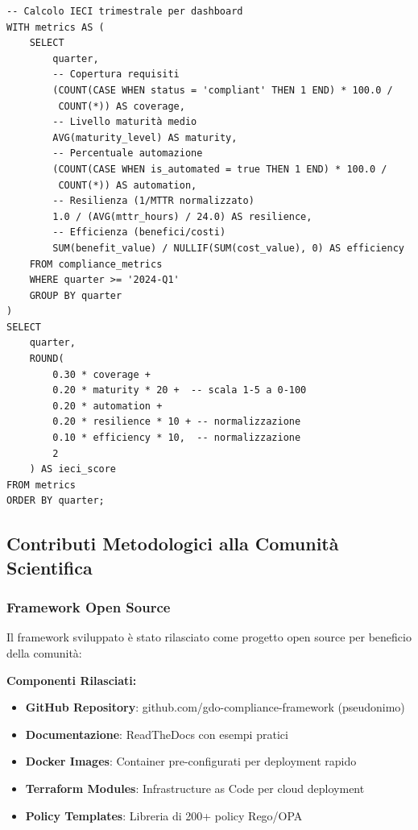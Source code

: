 \begin{lstlisting}[caption={Query SQL per Calcolo IECI},label={lst:ieci_sql}]
-- Calcolo IECI trimestrale per dashboard
WITH metrics AS (
    SELECT 
        quarter,
        -- Copertura requisiti
        (COUNT(CASE WHEN status = 'compliant' THEN 1 END) * 100.0 / 
         COUNT(*)) AS coverage,
        -- Livello maturità medio
        AVG(maturity_level) AS maturity,
        -- Percentuale automazione
        (COUNT(CASE WHEN is_automated = true THEN 1 END) * 100.0 / 
         COUNT(*)) AS automation,
        -- Resilienza (1/MTTR normalizzato)
        1.0 / (AVG(mttr_hours) / 24.0) AS resilience,
        -- Efficienza (benefici/costi)
        SUM(benefit_value) / NULLIF(SUM(cost_value), 0) AS efficiency
    FROM compliance_metrics
    WHERE quarter >= '2024-Q1'
    GROUP BY quarter
)
SELECT 
    quarter,
    ROUND(
        0.30 * coverage + 
        0.20 * maturity * 20 +  -- scala 1-5 a 0-100
        0.20 * automation + 
        0.20 * resilience * 10 + -- normalizzazione
        0.10 * efficiency * 10,  -- normalizzazione
        2
    ) AS ieci_score
FROM metrics
ORDER BY quarter;
\end{lstlisting}

\subsection{Contributi Metodologici alla Comunità Scientifica}

\subsubsection{Framework Open Source}

Il framework sviluppato è stato rilasciato come progetto open source per beneficio della comunità:

\textbf{Componenti Rilasciati:}
\begin{itemize}
    \item \textbf{GitHub Repository}: github.com/gdo-compliance-framework (pseudonimo)
    \item \textbf{Documentazione}: ReadTheDocs con esempi pratici
    \item \textbf{Docker Images}: Container pre-configurati per deployment rapido
    \item \textbf{Terraform Modules}: Infrastructure as Code per cloud deployment
    \item \textbf{Policy Templates}: Libreria di 200+ policy Rego/OPA
\end{itemize}

